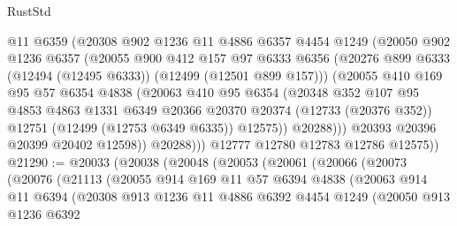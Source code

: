 \begin{lexlean}{RustStd}
\begin{coremodule}
{\begin{coremodule}
{{{{{{{{{{{{{{{{{{{{{{{{{{{{{{{{{{{{{{{{{{{{{{{{{{{{{{{{{{{{{{{{{{{{{{{{{{{{{{{{                @11
                @6359
                (@20308
                  @902
                  @1236
                  @11
                  @4886
                  @6357
                  @4454
                  @1249
                  (@20050
                    @902
                    @1236
                    @6357
                    (@20055
                      @900
                      @412
                      @157
                      @97
                      @6333
                      @6356
                      (@20276 @899 @6333 (@12494 (@12495 @6333)) (@12499 (@12501 @899 @157)))
                      (@20055
                        @410
                        @169
                        @95
                        @57
                        @6354
                        @4838
                        (@20063
                          @410
                          @95
                          @6354
                          (@20348
                            @352
                            @107
                            @95
                            @4853
                            @4863
                            @1331
                            @6349
                            @20366
                            @20370
                            @20374
                            (@12733 (@20376 @352))
                            @12751
                            (@12499 (@12753 @6349 @6335))
                            @12575))
                        @20288)))
                  @20393
                  @20396
                  @20399
                  @20402
                  @12598))
              @20288)))
        @12777
        @12780
        @12783
        @12786
        @12575))
@21290 := @20033
    (@20038
      (@20048
        (@20053
          (@20061
            (@20066
              (@20073
                (@20076
                  (@21113
                    (@20055
                      @914
                      @169
                      @11
                      @57
                      @6394
                      @4838
                      (@20063
                        @914
                        @11
                        @6394
                        (@20308
                          @913
                          @1236
                          @11
                          @4886
                          @6392
                          @4454
                          @1249
                          (@20050
                            @913
                            @1236
                            @6392
}}}}}}}}}}}}}}}}}}}}}}}}}}}}}}}}}}}}}}}}}}}}}}}}}}}}}}}}}}}}}}}}}}}}}}}}}}}}}}}}
\end{coremodule}}
\end{coremodule}
\end{lexlean}
